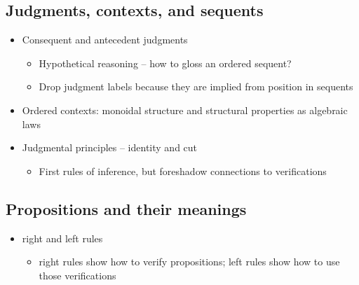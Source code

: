 \subsection{Judgments, contexts, and sequents}

\begin{itemize}
\item Consequent and antecedent judgments 
  \begin{itemize}
  \item Hypothetical reasoning -- how to gloss an ordered sequent?
  \item Drop judgment labels because they are implied from position in sequents
  \end{itemize}
\item Ordered contexts: monoidal structure and structural properties as algebraic laws
\item Judgmental principles -- identity and cut 
  \begin{itemize}
  \item First rules of inference, but foreshadow connections to verifications 
  \end{itemize}
\end{itemize}

\subsection{Propositions and their meanings}

\begin{itemize}
\item right and left rules 
  \begin{itemize}
  \item right rules show how to verify propositions; left rules show how to use those verifications 
  \end{itemize}
\end{itemize}



